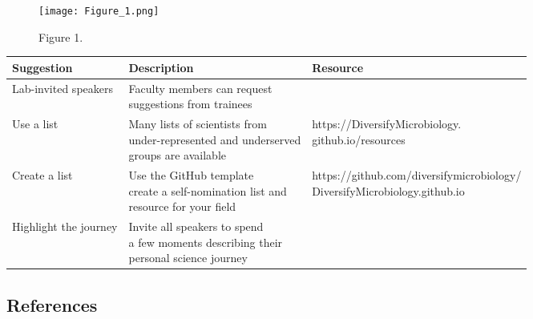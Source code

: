 \documentclass[10pt,]{article}
\begin{document}
\begin{figure}
\centering
\texttt{[image: Figure\_1.png]}
\caption{Figure 1.}
\end{figure}

\newpage

\begin{center}
\small
\begin{tabular}{|l|l|l|}
\hline

\rowcolor{lightgray}
\textbf{Suggestion} & \textbf{Description} & \textbf{Resource} \\ \hline

Lab-invited speakers & \makecell[l]{Faculty members can request \\suggestions from trainees} & \\ \hline

Use a list & \makecell[l]{Many lists of scientists from \\under-represented and underserved \\groups are available} &  \makecell[l]{https://DiversifyMicrobiology.\\github.io/resources}\\ \hline

Create a list & \makecell[l]{Use the GitHub template \\ create a self-nomination list and \\resource for your field} & \makecell[l]{https://github.com/diversifymicrobiology/\\DiversifyMicrobiology.github.io} \\ \hline

Highlight the journey & \makecell[l]{Invite all speakers to spend \\a few moments describing their \\personal science journey} & \\ \hline

\end{tabular}
\end{center}

\newpage

\subsection{References}\label{references}

\hypertarget{refs}{}
\end{document}
